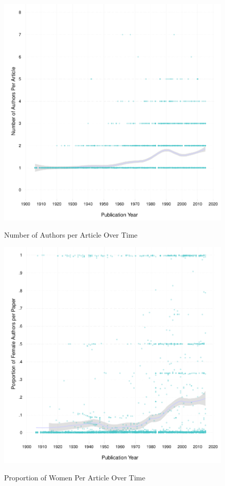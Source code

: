 \documentclass[11pt]{article}
\begin{document}
\begin{figure}[htbp]
\centering
\caption{Number of Authors per Article Over Time}
\includegraphics[scale=.85]{../figs/n_authors_per_article_over_time.pdf}
\label{fig:nauthors}
\end{figure}

\begin{figure}[htbp]
\centering
\caption{Proportion of Women Per Article Over Time}
\includegraphics[scale=.85]{../figs/gender_authors_per_article_over_time.pdf}
\label{fig:women}
\end{figure}
\end{document}
